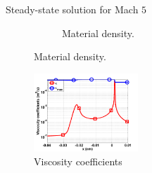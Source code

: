 \documentclass[xcolor=dvipsnames,10pt]{beamer}
\begin{document}
\begin{frame}{Steady-state solution for Mach $5$}
\begin{figure}
\begin{subfigure}[b]{0.35\textwidth}
        \caption{Material density.}
\end{subfigure}
\end{figure}

\begin{figure}
                \centering
                \includegraphics[width=0.35\textwidth]{../figures/Mach_5_nel_2000_viscosity.png}
        \caption{Viscosity coefficients}
\end{figure}
\end{frame}
\end{document}
